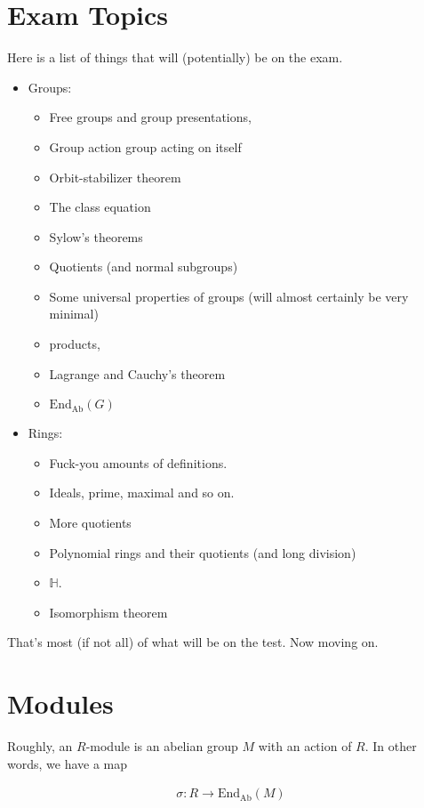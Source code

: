 \documentclass[12pt, twosided]{article}
\begin{document}
\section{Exam Topics}
Here is a list of things that will (potentially) be on the exam.
\begin{itemize}
\item Groups:
  \begin{itemize}
  \item Free groups and group presentations,
  \item Group action group acting on itself
  \item Orbit-stabilizer theorem
  \item The class equation
  \item Sylow's theorems
  \item Quotients (and normal subgroups)
  \item Some universal properties of groups (will almost certainly be very minimal)
  \item products, 
  \item Lagrange and Cauchy's theorem
  \item \(\mathrm{End}_{\mathrm{Ab}}(G)\)
  \end{itemize}
\item Rings:
  \begin{itemize}
  \item Fuck-you amounts of definitions. 
  \item Ideals, prime, maximal and so on.
  \item More quotients
  \item Polynomial rings and their quotients (and long division)
  \item \(\mathbb{H}\).
  \item Isomorphism theorem
  \end{itemize}
\end{itemize}

That's most (if not all) of what will be on the test. Now moving on.

\section{Modules}

Roughly, an \(R\)-module is an abelian group \(M\) with an action of \(R\). In other words, we have a map

\begin{align*}
  \sigma: R \to \mathrm{End}_{\mathrm{Ab}}(M)
\end{align*}
\end{document}
